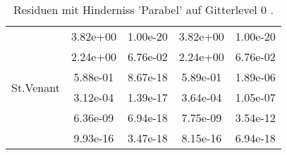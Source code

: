 \begin{table}
\begin{tabular}{c|cc|cc|}
\hline 
\multicolumn{1}{|c|}{\multirow{6}{*}{St.Venant}} &\multicolumn{1}{|c|}{  3.82e+00} & \multicolumn{1}{|c|}{  1.00e-20} & \multicolumn{1}{|c|}{  3.82e+00} & \multicolumn{1}{|c|}{  1.00e-20} \\ 
\multicolumn{1}{|c|}{} & \multicolumn{1}{|c|}{  2.24e+00} & \multicolumn{1}{|c|}{  6.76e-02} & \multicolumn{1}{|c|}{  2.24e+00} & \multicolumn{1}{|c|}{  6.76e-02} \\ 
\multicolumn{1}{|c|}{} & \multicolumn{1}{|c|}{  5.88e-01} & \multicolumn{1}{|c|}{  8.67e-18} & \multicolumn{1}{|c|}{  5.89e-01} & \multicolumn{1}{|c|}{  1.89e-06} \\ 
\multicolumn{1}{|c|}{} & \multicolumn{1}{|c|}{  3.12e-04} & \multicolumn{1}{|c|}{  1.39e-17} & \multicolumn{1}{|c|}{  3.64e-04} & \multicolumn{1}{|c|}{  1.05e-07} \\ 
\multicolumn{1}{|c|}{} & \multicolumn{1}{|c|}{  6.36e-09} & \multicolumn{1}{|c|}{  6.94e-18} & \multicolumn{1}{|c|}{  7.75e-09} & \multicolumn{1}{|c|}{  3.54e-12} \\ 
\multicolumn{1}{|c|}{} & \multicolumn{1}{|c|}{  9.93e-16} & \multicolumn{1}{|c|}{  3.47e-18} & \multicolumn{1}{|c|}{  8.15e-16} & \multicolumn{1}{|c|}{  6.94e-18} \\ 
\hline 
\end{tabular}\caption{Residuen mit Hinderniss 'Parabel' auf Gitterlevel 0 .}\label{tab:Residuum_Parabel_level0}
\end{table} 
